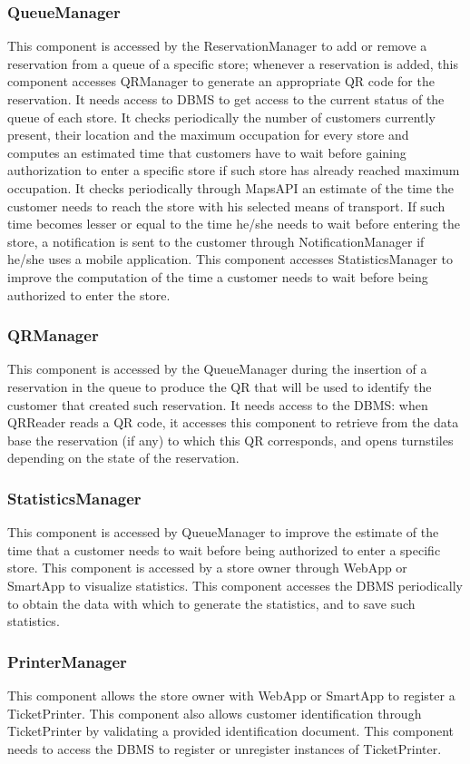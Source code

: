 \subsubsection{QueueManager}
This component is accessed by the ReservationManager to add or remove a reservation from a queue of a specific store; whenever a reservation is added, this component accesses QRManager to generate an appropriate QR code for the reservation. It needs access to DBMS to get access to the current status of the queue of each store. It checks periodically the number of customers currently present, their location and the maximum occupation for every store and computes an estimated time that customers have to wait before gaining authorization to enter a specific store if such store has already reached maximum occupation. It checks periodically through MapsAPI an estimate of the time the customer needs to reach the store with his selected means of transport. If such time becomes lesser or equal to the time he/she needs to wait before entering the store, a notification is sent to the customer through NotificationManager if he/she uses a mobile application. This component accesses StatisticsManager to improve the computation of the time a customer needs to wait before being authorized to enter the store.
\subsubsection{QRManager}
This component is accessed by the QueueManager during the insertion of a reservation in the queue to produce the QR that will be used to identify the customer that created such reservation. It needs access to the DBMS: when QRReader reads a QR code, it accesses this component to retrieve from the data base the reservation (if any) to which this QR corresponds, and opens turnstiles depending on the state of the reservation.
\subsubsection{StatisticsManager}
This component is accessed by QueueManager to improve the estimate of the time that a customer needs to wait before being authorized to enter a specific store. This component is accessed by a store owner through WebApp or SmartApp to visualize statistics. This component accesses the DBMS periodically to obtain the data with which to generate the statistics, and to save such statistics.
\subsubsection{PrinterManager}
This component allows the store owner with WebApp or SmartApp to register a TicketPrinter. This component also allows customer identification through TicketPrinter by validating a provided identification document. This component needs to access the DBMS to register or unregister instances of TicketPrinter.
